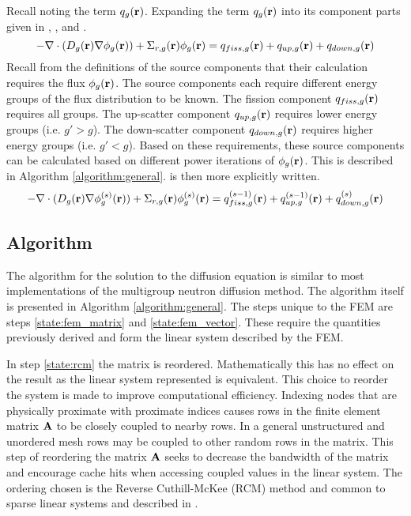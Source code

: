     Recall  noting the term $q_g(\mathbf{r})$. Expanding the
    term $q_g(\mathbf{r})$ into its component parts given in ,
    , and . 
    \begin{equation} \label{eq:multigroup_source_expand}
      -\mathbf{\nabla} \cdot (D_g(\mathbf{r}) \mathbf{\nabla} \phi_g(\mathbf{r})) + \Sigma_{r,g}(\mathbf{r}) \phi_g(\mathbf{r}) 
        = q_{fiss,g}(\mathbf{r}) + q_{up,g}(\mathbf{r}) + q_{down,g}(\mathbf{r})
    \end{equation}
    Recall from the definitions of the source components that their calculation
    requires the flux $\phi_g(\mathbf{r})$. The source components each require
    different energy groups of the flux distribution to be known. The fission
    component $q_{fiss,g}(\mathbf{r})$ requires all groups. The up-scatter component
    $q_{up,g}(\mathbf{r})$ requires lower energy groups (i.e. $g' > g$). The
    down-scatter component $q_{down,g}(\mathbf{r})$ requires higher energy groups (i.e.
    $g' < g$). Based on these requirements, these source components can be
    calculated based on different power iterations of $\phi_g(\mathbf{r})$. This is
    described in Algorithm \ref{algorithm:general}.
     is then more explicitly written.
    \begin{equation} \label{eq:multigroup_power_iterations}
      -\mathbf{\nabla} \cdot (D_g(\mathbf{r}) \mathbf{\nabla} \phi_g^{(s)}(\mathbf{r})) + \Sigma_{r,g}(\mathbf{r})
      \phi_g^{(s)}(\mathbf{r}) = q_{fiss,g}^{(s-1)}(\mathbf{r}) + q_{up,g}^{(s-1)}(\mathbf{r}) +
      q_{down,g}^{(s)}(\mathbf{r})
    \end{equation}

  \subsection{Algorithm}
    The algorithm for the solution to the diffusion equation is similar to most
    implementations of the multigroup neutron diffusion method. The algorithm 
    itself is presented in Algorithm \ref{algorithm:general}. The steps unique 
    to the FEM are steps \ref{state:fem_matrix} and \ref{state:fem_vector}. 
    These require the quantities previously derived and form the linear system 
    described by the FEM. 
    
    In step \ref{state:rcm} the matrix is reordered. Mathematically this has no
    effect on the result as the linear system represented is equivalent. This 
    choice to reorder the system is made to improve computational efficiency. 
    Indexing nodes that are physically proximate with proximate indices causes 
    rows in the finite element matrix $\mathbf{A}$ to be closely coupled to nearby
    rows. In a general unstructured and unordered mesh rows may be coupled to 
    other random rows in the matrix. This step of reordering the matrix $\mathbf{A}$ 
    seeks to decrease the bandwidth of the matrix and encourage cache hits when
    accessing coupled values in the linear system. The ordering chosen is the
    Reverse Cuthill-McKee (RCM) method and common to sparse linear systems and 
    described in \cite{rcm}.
    
